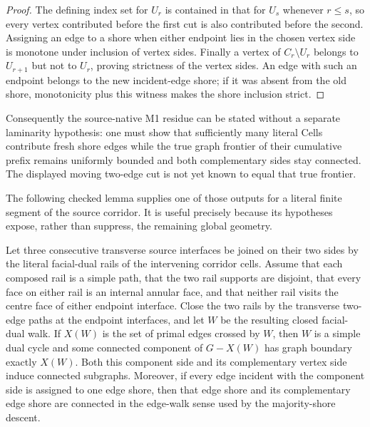 \begin{proof}
The defining index set for \(U_r\) is contained in that for \(U_s\) whenever
\(r\le s\), so every vertex contributed before the first cut is also
contributed before the second.  Assigning an edge to a shore when either
endpoint lies in the chosen vertex side is monotone under inclusion of vertex
sides.  Finally a vertex of \(C_r\setminus U_r\) belongs to \(U_{r+1}\) but not
to \(U_r\), proving strictness of the vertex sides.  An edge with such an
endpoint belongs to the new incident-edge shore; if it was absent from the old
shore, monotonicity plus this witness makes the shore inclusion strict.
\end{proof}

Consequently the source-native M1 residue can be stated without a separate
laminarity hypothesis: one must show that sufficiently many literal Cells
contribute fresh shore edges while the true graph frontier of their cumulative
prefix remains uniformly bounded and both complementary sides stay connected.
The displayed moving two-edge cut is not yet known to equal that true
frontier.

The following checked lemma supplies one of those outputs for a literal
finite segment of the source corridor.  It is useful precisely because its
hypotheses expose, rather than suppress, the remaining global geometry.

\begin{lemma}
\label{lem:source-rail-segment-exact-shore}
Let three consecutive transverse source interfaces be joined on their two
sides by the literal facial-dual rails of the intervening corridor cells.
Assume that each composed rail is a simple path, that the two rail supports
are disjoint, that every face on either rail is an internal annular face,
and that neither rail visits the centre face of either endpoint interface.
Close the two rails by the transverse two-edge paths at the
endpoint interfaces, and let $W$ be the resulting closed facial-dual walk.
If $X(W)$ is the set of primal edges crossed by $W$, then $W$ is a
simple dual cycle and some connected component of $G-X(W)$ has graph
boundary exactly $X(W)$.  Both this component side and its complementary
vertex side induce connected subgraphs.  Moreover, if every edge incident
with the component side is assigned to one edge shore, then that edge shore
and its complementary edge shore are connected in the edge-walk sense used
by the majority-shore descent.
\end{lemma}

